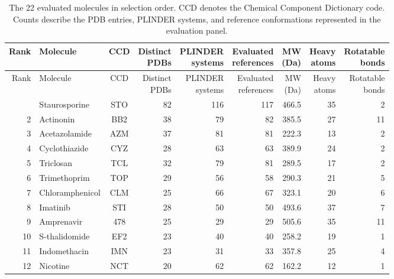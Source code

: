 \begingroup
\setlength{\tabcolsep}{3pt}
\renewcommand{\arraystretch}{1.15}
\footnotesize
\begin{longtable}{@{}rlcrrrrrr@{}}
\caption{The 22 evaluated molecules in selection order. CCD denotes the Chemical Component Dictionary code. Counts describe the PDB entries, PLINDER systems, and reference conformations represented in the evaluation panel.}\label{tab:plinder23-molecules}\\
\toprule
Rank & Molecule & CCD & \shortstack{Distinct\\PDBs} & \shortstack{PLINDER\\systems} & \shortstack{Evaluated\\references} & \shortstack{MW\\(Da)} & \shortstack{Heavy\\atoms} & \shortstack{Rotatable\\bonds}\\
\midrule
\endfirsthead
\toprule
Rank & Molecule & CCD & \shortstack{Distinct\\PDBs} & \shortstack{PLINDER\\systems} & \shortstack{Evaluated\\references} & \shortstack{MW\\(Da)} & \shortstack{Heavy\\atoms} & \shortstack{Rotatable\\bonds}\\
\midrule
\endhead
\bottomrule
\endfoot
1 & Staurosporine & STO & 82 & 116 & 117 & 466.5 & 35 & 2\\
2 & Actinonin & BB2 & 38 & 79 & 82 & 385.5 & 27 & 11\\
3 & Acetazolamide & AZM & 37 & 81 & 81 & 222.3 & 13 & 2\\
4 & Cyclothiazide & CYZ & 28 & 63 & 63 & 389.9 & 24 & 2\\
5 & Triclosan & TCL & 32 & 79 & 81 & 289.5 & 17 & 2\\
6 & Trimethoprim & TOP & 29 & 56 & 58 & 290.3 & 21 & 5\\
7 & Chloramphenicol & CLM & 25 & 66 & 67 & 323.1 & 20 & 6\\
8 & Imatinib & STI & 28 & 50 & 50 & 493.6 & 37 & 7\\
9 & Amprenavir & 478 & 25 & 29 & 29 & 505.6 & 35 & 11\\
10 & S-thalidomide & EF2 & 23 & 40 & 40 & 258.2 & 19 & 1\\
11 & Indomethacin & IMN & 23 & 31 & 33 & 357.8 & 25 & 4\\
12 & Nicotine & NCT & 20 & 62 & 62 & 162.2 & 12 & 1\\

\end{longtable}
